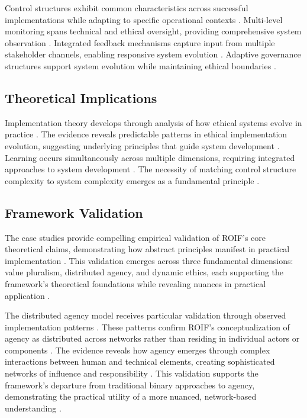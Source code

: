 \documentclass[12pt]{article}
\begin{document}
Control structures exhibit common characteristics across successful implementations while adapting to specific operational contexts \parencite{desanctis1994}. Multi-level monitoring spans technical and ethical oversight, providing comprehensive system observation \parencite{yeung2018}. Integrated feedback mechanisms capture input from multiple stakeholder channels, enabling responsive system evolution \parencite{friedman2008}. Adaptive governance structures support system evolution while maintaining ethical boundaries \parencite{dignum2019}.

\subsection{Theoretical Implications}

Implementation theory develops through analysis of how ethical systems evolve in practice \parencite{orlikowski2007}. The evidence reveals predictable patterns in ethical implementation evolution, suggesting underlying principles that guide system development \parencite{march1991}. Learning occurs simultaneously across multiple dimensions, requiring integrated approaches to system development \parencite{nonaka1995}. The necessity of matching control structure complexity to system complexity emerges as a fundamental principle \parencite{senge1990}.

\subsection{Framework Validation}

The case studies provide compelling empirical validation of ROIF's core theoretical claims, demonstrating how abstract principles manifest in practical implementation \parencite{eisenhardt1989,yin2018}. This validation emerges across three fundamental dimensions: value pluralism, distributed agency, and dynamic ethics, each supporting the framework's theoretical foundations while revealing nuances in practical application \parencite{miles2014}.

The distributed agency model receives particular validation through observed implementation patterns \parencite{latour2005}. These patterns confirm ROIF's conceptualization of agency as distributed across networks rather than residing in individual actors or components \parencite{johnson2005}. The evidence reveals how agency emerges through complex interactions between human and technical elements, creating sophisticated networks of influence and responsibility \parencite{verbeek2011}. This validation supports the framework's departure from traditional binary approaches to agency, demonstrating the practical utility of a more nuanced, network-based understanding \parencite{matthias2004}.
\end{document}
